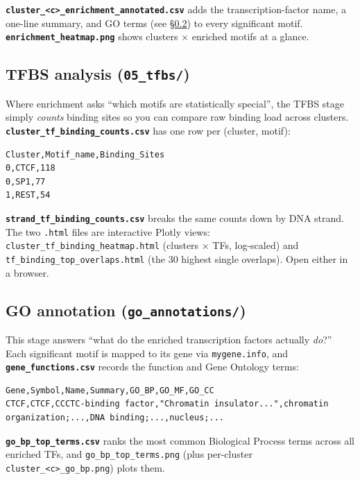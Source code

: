 \documentclass[11pt]{article}
\begin{document}
\textbf{\texttt{cluster\_<c>\_enrichment\_annotated.csv}} adds the
transcription-factor name, a one-line summary, and GO terms (see
\S\ref{sec:go}) to every significant motif. \textbf{\texttt{enrichment\_heatmap.png}}
shows clusters $\times$ enriched motifs at a glance.

\subsection{TFBS analysis (\texttt{05\_tfbs/})}

Where enrichment asks ``which motifs are statistically special'', the
TFBS stage simply \emph{counts} binding sites so you can compare raw
binding load across clusters.
\textbf{\texttt{cluster\_tf\_binding\_counts.csv}} has one row per
(cluster, motif):

\begin{lstlisting}
Cluster,Motif_name,Binding_Sites
0,CTCF,118
0,SP1,77
1,REST,54
\end{lstlisting}

\textbf{\texttt{strand\_tf\_binding\_counts.csv}} breaks the same counts
down by DNA strand. The two \texttt{.html} files are interactive Plotly
views: \texttt{cluster\_tf\_binding\_heatmap.html} (clusters $\times$ TFs,
log-scaled) and \texttt{tf\_binding\_top\_overlaps.html} (the 30 highest
single overlaps). Open either in a browser.

\subsection{GO annotation (\texttt{go\_annotations/})}
\label{sec:go}

This stage answers ``what do the enriched transcription factors actually
\emph{do}?'' Each significant motif is mapped to its gene via
\texttt{mygene.info}, and \textbf{\texttt{gene\_functions.csv}} records
the function and Gene Ontology terms:

\begin{lstlisting}
Gene,Symbol,Name,Summary,GO_BP,GO_MF,GO_CC
CTCF,CTCF,CCCTC-binding factor,"Chromatin insulator...",chromatin organization;...,DNA binding;...,nucleus;...
\end{lstlisting}

\textbf{\texttt{go\_bp\_top\_terms.csv}} ranks the most common Biological
Process terms across all enriched TFs, and \texttt{go\_bp\_top\_terms.png}
(plus per-cluster \texttt{cluster\_<c>\_go\_bp.png}) plots them.
\end{document}
